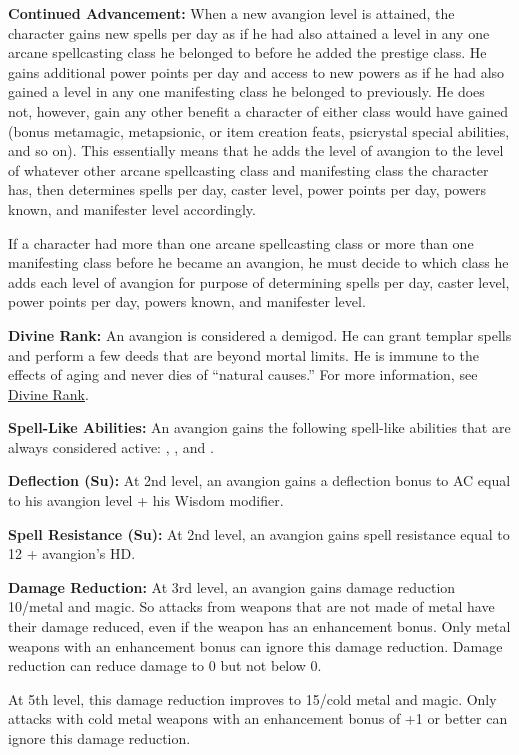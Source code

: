 {
\textbf{Continued Advancement:} When a new avangion level is attained, the character gains new spells per day as if he had also attained a level in any one arcane spellcasting class he belonged to before he added the prestige class. He gains additional power points per day and access to new powers as if he had also gained a level in any one manifesting class he belonged to previously. He does not, however, gain any other benefit a character of either class would have gained (bonus metamagic, metapsionic, or item creation feats, psicrystal special abilities, and so on). This essentially means that he adds the level of avangion to the level of whatever other arcane spellcasting class and manifesting class the character has, then determines spells per day, caster level, power points per day, powers known, and manifester level accordingly.

If a character had more than one arcane spellcasting class or more than one manifesting class before he became an avangion, he must decide to which class he adds each level of avangion for purpose of determining spells per day, caster level, power points per day, powers known, and manifester level.

\textbf{Divine Rank:} An avangion is considered a demigod. He can grant templar spells and perform a few deeds that are beyond mortal limits. He is immune to the effects of aging and never dies of ``natural causes.'' For more information, see \hyperref[Divine Rank]{Divine Rank}.

\textbf{Spell-Like Abilities:} An avangion gains the following spell-like abilities that are always considered active: , , and .


\textbf{Deflection (Su):} At 2nd level, an avangion gains a deflection bonus to AC equal to his avangion level + his Wisdom modifier.

\textbf{Spell Resistance (Su):} At 2nd level, an avangion gains spell resistance equal to 12 + avangion's HD.

\textbf{Damage Reduction:} At 3rd level, an avangion gains damage reduction 10/metal and magic. So attacks from weapons that are not made of metal have their damage reduced, even if the weapon has an enhancement bonus. Only metal weapons with an enhancement bonus can ignore this damage reduction. Damage reduction can reduce damage to 0 but not below 0.

At 5th level, this damage reduction improves to 15/cold metal and magic. Only attacks with cold metal weapons with an enhancement bonus of +1 or better can ignore this damage reduction.

}
